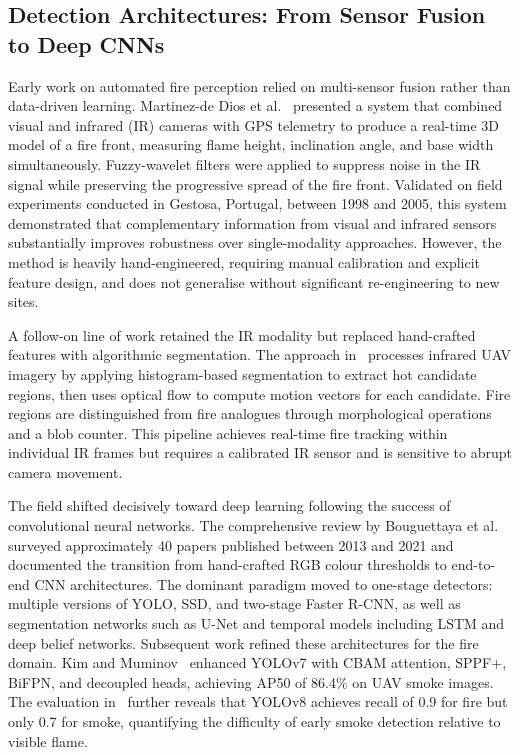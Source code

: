 \documentclass[11pt,twocolumn]{article}
\begin{document}
\subsection{Detection Architectures: From Sensor Fusion to Deep CNNs}

Early work on automated fire perception relied on multi-sensor fusion
rather than data-driven learning. Martinez-de Dios et al.~\cite{martinez2008}
presented a system that combined visual and infrared (IR) cameras with
GPS telemetry to produce a real-time 3D model of a fire front, measuring
flame height, inclination angle, and base width simultaneously.
Fuzzy-wavelet filters were applied to suppress noise in the IR signal
while preserving the progressive spread of the fire front. Validated on
field experiments conducted in Gestosa, Portugal, between 1998 and 2005,
this system demonstrated that complementary information from visual and
infrared sensors substantially improves robustness over single-modality
approaches. However, the method is heavily hand-engineered, requiring
manual calibration and explicit feature design, and does not generalise
without significant re-engineering to new sites.

A follow-on line of work retained the IR modality but replaced
hand-crafted features with algorithmic segmentation. The approach
in~\cite{uav_ir2017} processes infrared UAV imagery by applying
histogram-based segmentation to extract hot candidate regions, then
uses optical flow to compute motion vectors for each candidate. Fire
regions are distinguished from fire analogues through morphological
operations and a blob counter. This pipeline achieves real-time fire
tracking within individual IR frames but requires a calibrated IR
sensor and is sensitive to abrupt camera movement.

The field shifted decisively toward deep learning following the success
of convolutional neural networks. The comprehensive review by
Bouguettaya et al.~\cite{bouguettaya2022} surveyed approximately 40
papers published between 2013 and 2021 and documented the transition
from hand-crafted RGB colour thresholds to end-to-end CNN architectures.
The dominant paradigm moved to one-stage detectors: multiple versions
of YOLO, SSD, and two-stage Faster R-CNN, as well as segmentation
networks such as U-Net and temporal models including LSTM and deep
belief networks. Subsequent work refined these architectures for the
fire domain. Kim and Muminov~\cite{kim2023} enhanced YOLOv7 with CBAM
attention, SPPF+, BiFPN, and decoupled heads, achieving AP50 of 86.4\%
on UAV smoke images. The evaluation in~\cite{yolov8_2024} further
reveals that YOLOv8 achieves recall of 0.9 for fire but only 0.7 for
smoke, quantifying the difficulty of early smoke detection
relative to visible flame.
\end{document}
